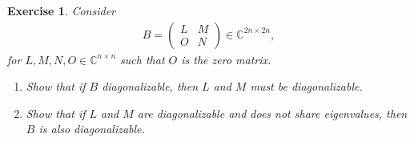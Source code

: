 \documentclass[11pt]{article}
\newtheorem{exercise}{Exercise}[section]
\theoremstyle{definition}
\numberwithin{equation}{subsection}
\begin{document}
\medskip

\begin{exercise}{\rm *}
Consider
\begin{align*}
    B = \begin{pmatrix}
        L & M \\
        O & N
    \end{pmatrix} \in \mathbb{C}^{2n \times 2n},
\end{align*}
for $L,M,N,O \in \mathbb{C}^{n \times n}$ such that $O$ is the zero matrix.
\begin{enumerate}[label=(\alph*)]
    \item Show that if $B$ diagonalizable, then $L$ and $M$ must be diagonalizable.
    
    \item Show that if $L$ and $M$ are diagonalizable and does not share eigenvalues, then $B$ is also diagonalizable.
\end{enumerate}
\end{exercise}
\end{document}
